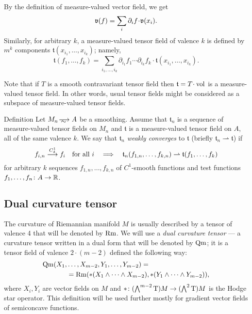 By the definition of measure-valued vector field, we get
\[\mathfrak{v}(f)=\sum_{i}\partial_i f\cdot \vv(x_i).\]
Similarly, for arbitrary $k$, a measure-valued tensor field of valence $k$ is defined by $m^k$ components 
$\mathfrak{t}(x_{i_1},\dots,x_{i_k})$; namely,
\[\mathfrak{t}(f_1,\dots,f_k)
=
\sum_{i_1,\dots,i_k}
\partial_{i_1} f_1 
\cdots 
\partial_{i_k} f_k
\cdot \mathfrak{t}(x_{i_1},\dots,x_{i_k}).\]

Note that if $T$ is a smooth contravariant tensor field then $\mathfrak{t}=T\cdot \vol$ is a measure-valued tensor field.
In other words, usual tensor fields might be considered as a subspace of measure-valued tensor fields.

\begin{rdef}{Definition}
Let $M_n\smooths{} A$ be a smoothing.
Assume that $\mathfrak{t}_n$ is a sequence of %
 measure-valued tensor fields on $M_n$  and $\mathfrak{t}$ is a measure-valued tensor field on $A$,
all of the same valence $k$.
We say that $\mathfrak{t}_n$ \emph{weakly converges} to  $\mathfrak{t}$
(briefly $\mathfrak{t}_n\rightharpoonup\mathfrak{t}$) if
\[f_{i,n}\smoothto f_i\quad\text{for all\ } i
\quad\Longrightarrow\quad
\mathfrak{t}_n(f_{1,n},\dots,f_{k,n})\zz\rightharpoonup\mathfrak{t}(f_{1},\dots,f_{k})\]
for arbitrary $k$ sequences $f_{1,n},\dots,f_{k,n}$ of $C^1$-smooth functions and test functions $f_1,\dots,f_n\:A\zz\to\RR$.
\end{rdef}

\subsection{Dual curvature tensor}

The curvature of Riemannian manifold $M$ is usually described by a tensor of valence 4 that will be denoted by $\operatorname{\rm Rm}$.
We will use a \emph{dual curvature tensor} --- 
a curvature tensor written in a dual form that will be denoted by $\operatorname{\rm Qm}$;
it is a tensor field of valence $2\cdot(m-2)$ defined the following way:
\begin{align*}
\operatorname{\rm Qm}(X_1,&\dots,X_{m-2},Y_1,\dots,Y_{m-2})
= 
\\
&=
\operatorname{\rm Rm}(*(X_1\wedge\dots\wedge X_{m-2}),*(Y_1\wedge\dots\wedge Y_{m-2})),
\end{align*}
where $X_i,Y_i$ are vector fields on $M$ and  ${*}\:(\bigwedge^{m-2}\T)M\zz\to(\bigwedge^2\T)M$ is the  Hodge star operator.
This definition will be used further mostly for gradient vector fields of semiconcave functions.

